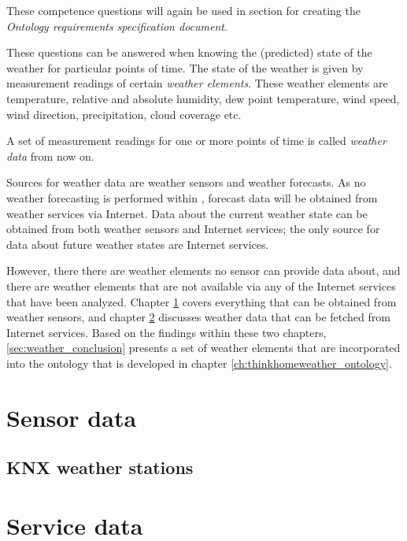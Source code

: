 These competence questions will again be used in section \label{sec:ontology_specification} for creating the \emph{Ontology requirements specification document}.

These questions can be answered when knowing the (predicted) state of the weather for particular points of time. The state of the weather is given by measurement readings of certain \emph{weather elements}. These weather elements are temperature, relative and absolute humidity, dew point temperature, wind speed, wind direction, precipitation, cloud coverage etc.

A set of measurement readings for one or more points of time is called \emph{weather data} from now on.

Sources for weather data are weather sensors and weather forecasts. As no weather forecasting is performed within \thinkhome, forecast data will be obtained from weather services via Internet. Data about the current weather state can be obtained from both weather sensors and Internet services; the only source for data about future weather states are Internet services.

However, there there are weather elements no sensor can provide data about, and there are weather elements that are not available via any of the Internet services that have been analyzed. Chapter \ref{sec:weather_sensors} covers everything that can be obtained from weather sensors, and chapter \ref{sec:weather_services} discusses weather data that can be fetched from Internet services. Based on the findings within these two chapters, \ref{sec:weather_conclusion} presents a set of weather elements that are incorporated into the ontology that is developed in chapter \ref{ch:thinkhomeweather_ontology}.

\section{Sensor data}
\label{sec:weather_sensors}

\subsection{KNX weather stations}

\section{Service data}
\label{sec:weather_services}


